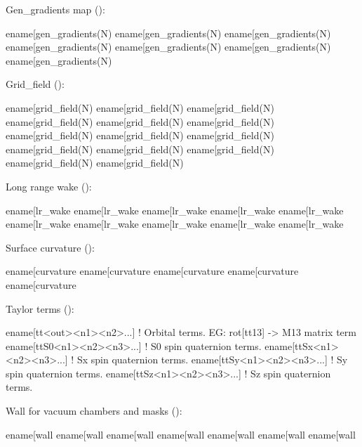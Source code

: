 {{{{{Gen_gradients map ():
\begin{example}
  ename[gen_gradients(N)%
  ename[gen_gradients(N)%
  ename[gen_gradients(N)%
  ename[gen_gradients(N)%
  ename[gen_gradients(N)%
  ename[gen_gradients(N)%
  ename[gen_gradients(N)%
\end{example}

Grid_field ():
\begin{example}
  ename[grid_field(N)%
  ename[grid_field(N)%
  ename[grid_field(N)%
  ename[grid_field(N)%
  ename[grid_field(N)%
  ename[grid_field(N)%
  ename[grid_field(N)%
  ename[grid_field(N)%
  ename[grid_field(N)%
  ename[grid_field(N)%
  ename[grid_field(N)%
  ename[grid_field(N)%
  ename[grid_field(N)%
  ename[grid_field(N)%
\end{example}

Long range wake ():
\begin{example}
  ename[lr_wake%
  ename[lr_wake%
  ename[lr_wake%
  ename[lr_wake%
  ename[lr_wake%
  ename[lr_wake%
  ename[lr_wake%
  ename[lr_wake%
  ename[lr_wake%
  ename[lr_wake%
\end{example}

Surface curvature ():
\begin{example}
  ename[curvature%
  ename[curvature%
  ename[curvature%
  ename[curvature%
  ename[curvature%
\end{example}

Taylor terms ():
\begin{example}
  ename[tt<out><n1><n2>...]      ! Orbital terms. EG: rot[tt13] -> M13 matrix term
  ename[ttS0<n1><n2><n3>...]     ! S0 spin quaternion terms.
  ename[ttSx<n1><n2><n3>...]     ! Sx spin quaternion terms.
  ename[ttSy<n1><n2><n3>...]     ! Sy spin quaternion terms.
  ename[ttSz<n1><n2><n3>...]     ! Sz spin quaternion terms.
\end{example}

Wall for vacuum chambers and masks ():
\begin{example}
  ename[wall%
  ename[wall%
  ename[wall%
  ename[wall%
  ename[wall%
  ename[wall%
  ename[wall%
\end{example}

}}}}}
